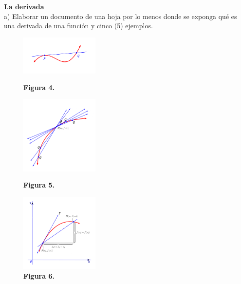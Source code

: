 \documentclass[11pt]{report}
\begin{document}
\pagebreak \textbf {La derivada}\\[2mm]
a) Elaborar un documento de una hoja por lo menos donde se exponga qué es una derivada de una función y cinco (5) ejemplos.
\begin{figure}
\includegraphics[width=0.35\textwidth]{der_fig1}
\caption*{\textbf{Figura 4.}}
\label{figu:mesh1}
\includegraphics[width=0.35\textwidth]{der_fig2}
\caption*{\textbf{Figura 5.}}
\label{figu:mesh2}
\includegraphics[width=0.35\textwidth]{der_fig3}
\caption*{\textbf{Figura 6.}}
\label{figu:mesh3}
\end{figure}
\end{document}
